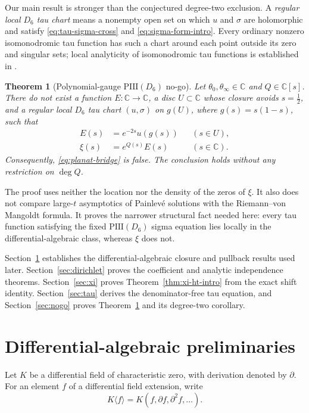 \documentclass[11pt]{article}
\numberwithin{equation}{section}
\newtheorem{theorem}{Theorem}[section]
\theoremstyle{definition}
\theoremstyle{remark}
\newcommand{\C}{\mathbb C}
\begin{document}
Our main result is stronger than the conjectured degree-two exclusion.  A \emph{regular local
$D_6$ tau chart} means a nonempty open set on which $u$ and $\sigma$ are holomorphic and satisfy
\eqref{eq:tau-sigma-cross} and \eqref{eq:sigma-form-intro}.  Every ordinary nonzero
isomonodromic tau function has such a chart around each point outside its zero and singular
sets; local analyticity of isomonodromic tau functions is established in
\cite{JMU1981,Miwa1981}.

\begin{theorem}[Polynomial-gauge $\mathrm{PIII}(D_6)$ no-go]
\label{thm:main-intro}
Let $\theta_0,\theta_\infty\in\C$ and $Q\in\C[s]$.  There do not exist a function
$E:\C\to\C$, a disc $U\subset\C$ whose closure avoids $s=\tfrac12$, and a regular local $D_6$ tau chart
$(u,\sigma)$ on $g(U)$, where $g(s)=s(1-s)$, such that
\begin{align}
 E(s)&=e^{-2s}u(g(s)) &&(s\in U),\label{eq:local-carrier}\\
 \xi(s)&=e^{Q(s)}E(s) &&(s\in\C).\label{eq:global-bridge}
\end{align}
Consequently, \eqref{eq:planat-bridge} is false.  The conclusion holds without any restriction
on $\deg Q$.
\end{theorem}

The proof uses neither the location nor the density of the zeros of $\xi$.  It also does not
compare large-$t$ asymptotics of Painlev\'e solutions with the Riemann--von Mangoldt formula.
It proves the narrower structural fact needed here: every tau function satisfying the fixed
$\mathrm{PIII}(D_6)$ sigma equation lies locally in the differential-algebraic class, whereas
$\xi$ does not.

Section~\ref{sec:da} establishes the differential-algebraic closure and pullback results used
later.  Section~\ref{sec:dirichlet} proves the coefficient and analytic independence theorems.
Section~\ref{sec:xi} proves Theorem~\ref{thm:xi-ht-intro} from the exact shift identity.
Section~\ref{sec:tau} derives the denominator-free tau equation, and
Section~\ref{sec:nogo} proves Theorem~\ref{thm:main-intro} and its degree-two corollary.

\section{Differential-algebraic preliminaries}
\label{sec:da}

Let $K$ be a differential field of characteristic zero, with derivation denoted by $\partial$.
For an element $f$ of a differential field extension, write
\[
 K\langle f\rangle=K(f,\partial f,\partial^2f,\ldots).
\]
\end{document}
